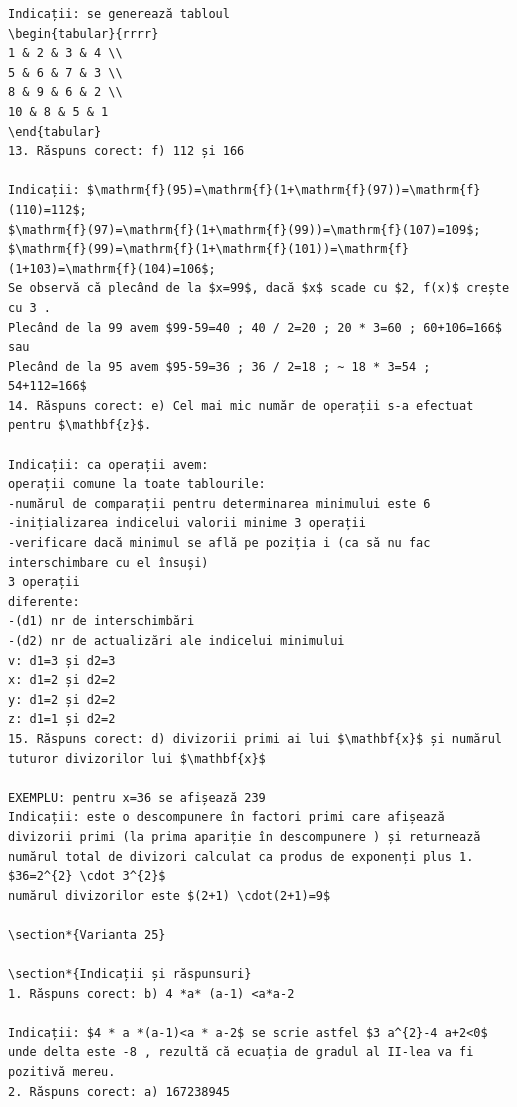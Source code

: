 \documentclass[10pt]{article}
\begin{document}
\begin{verbatim}
Indicații: se generează tabloul
\begin{tabular}{rrrr}
1 & 2 & 3 & 4 \\
5 & 6 & 7 & 3 \\
8 & 9 & 6 & 2 \\
10 & 8 & 5 & 1
\end{tabular}
13. Răspuns corect: f) 112 și 166

Indicații: $\mathrm{f}(95)=\mathrm{f}(1+\mathrm{f}(97))=\mathrm{f}(110)=112$;
$\mathrm{f}(97)=\mathrm{f}(1+\mathrm{f}(99))=\mathrm{f}(107)=109$;
$\mathrm{f}(99)=\mathrm{f}(1+\mathrm{f}(101))=\mathrm{f}(1+103)=\mathrm{f}(104)=106$;
Se observă că plecând de la $x=99$, dacă $x$ scade cu $2, f(x)$ crește cu 3 .
Plecând de la 99 avem $99-59=40 ; 40 / 2=20 ; 20 * 3=60 ; 60+106=166$ sau
Plecând de la 95 avem $95-59=36 ; 36 / 2=18 ; ~ 18 * 3=54 ; 54+112=166$
14. Răspuns corect: e) Cel mai mic număr de operații s-a efectuat pentru $\mathbf{z}$.

Indicații: ca operații avem:
operații comune la toate tablourile:
-numărul de comparații pentru determinarea minimului este 6
-inițializarea indicelui valorii minime 3 operații
-verificare dacă minimul se află pe poziția i (ca să nu fac interschimbare cu el însuși)
3 operații
diferente:
-(d1) nr de interschimbări
-(d2) nr de actualizări ale indicelui minimului
v: d1=3 și d2=3
x: d1=2 și d2=2
y: d1=2 și d2=2
z: d1=1 și d2=2
15. Răspuns corect: d) divizorii primi ai lui $\mathbf{x}$ și numărul tuturor divizorilor lui $\mathbf{x}$

EXEMPLU: pentru x=36 se afișează 239
Indicații: este o descompunere în factori primi care afișează divizorii primi (la prima apariție în descompunere ) și returnează numărul total de divizori calculat ca produs de exponenți plus 1.
$36=2^{2} \cdot 3^{2}$
numărul divizorilor este $(2+1) \cdot(2+1)=9$

\section*{Varianta 25}

\section*{Indicații și răspunsuri}
1. Răspuns corect: b) 4 *a* (a-1) <a*a-2

Indicații: $4 * a *(a-1)<a * a-2$ se scrie astfel $3 a^{2}-4 a+2<0$ unde delta este -8 , rezultă că ecuația de gradul al II-lea va fi pozitivă mereu.
2. Răspuns corect: a) 167238945


\end{verbatim}
\end{document}
